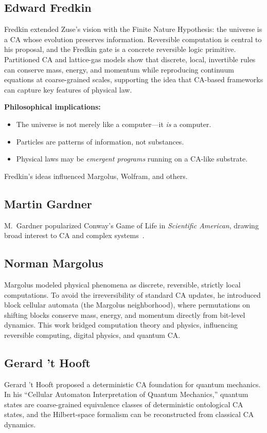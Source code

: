 \documentclass{ijuc}
\begin{document}
\subsection*{Edward Fredkin}
Fredkin \cite{fredkin} extended Zuse's vision with the Finite Nature Hypothesis: the universe is a CA whose evolution preserves information. Reversible computation is central to his proposal, and the Fredkin gate is a concrete reversible logic primitive. Partitioned CA and lattice-gas models show that discrete, local, invertible rules can conserve mass, energy, and momentum while reproducing continuum equations at coarse-grained scales, supporting the idea that CA-based frameworks can capture key features of physical law.

\textbf{Philosophical implications:}
\begin{itemize}
  \item The universe is not merely like a computer---it \emph{is} a computer.
  \item Particles are patterns of information, not substances.
  \item Physical laws may be \emph{emergent programs} running on a CA-like substrate.
\end{itemize}

Fredkin's ideas influenced Margolus, Wolfram, and others.

\subsection*{Martin Gardner}
M.~Gardner popularized Conway's Game of Life in \emph{Scientific American}, drawing broad interest to CA and complex systems~\cite{gardner1970}.

\subsection*{Norman Margolus}
Margolus \cite{margolus} modeled physical phenomena as discrete, reversible, strictly local computations. To avoid the irreversibility of standard CA updates, he introduced block cellular automata (the Margolus neighborhood), where permutations on shifting blocks conserve mass, energy, and momentum directly from bit-level dynamics. This work bridged computation theory and physics, influencing reversible computing, digital physics, and quantum CA.

\subsection*{Gerard 't Hooft}
Gerard 't Hooft \cite{thooft} proposed a deterministic CA foundation for quantum mechanics. In his ``Cellular Automaton Interpretation of Quantum Mechanics,'' quantum states are coarse-grained equivalence classes of deterministic ontological CA states, and the Hilbert-space formalism can be reconstructed from classical CA dynamics.
\end{document}
